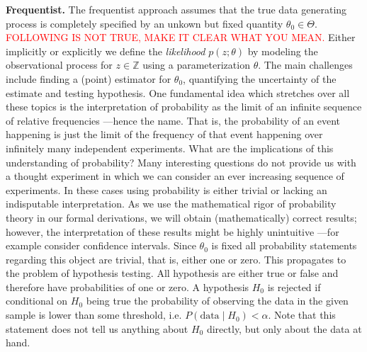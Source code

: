 \textbf{Frequentist.} The frequentist approach assumes that the true data generating process is completely specified by an unkown but fixed quantity $\theta_0 \in \Theta$.
\textcolor{red}{FOLLOWING IS NOT TRUE, MAKE IT CLEAR WHAT YOU MEAN.}
Either implicitly or explicitly we define the \textit{likelihood} $p(z; \theta)$ by modeling the observational process for $z \in \mathbb{Z}$ using a parameterization $\theta$.
The main challenges include finding a (point) estimator for $\theta_0$, quantifying the uncertainty of the estimate and testing hypothesis.
One fundamental idea which stretches over all these topics is the interpretation of probability as the limit of an infinite sequence of relative frequencies ---hence the name.
That is, the probability of an event happening is just the limit of the frequency of that event happening over infinitely many independent experiments.
What are the implications of this understanding of probability?
Many interesting questions do not provide us with a thought experiment in which we can consider an ever increasing sequence of experiments.
In these cases using probability is either trivial or lacking an indisputable interpretation.
As we use the mathematical rigor of probability theory in our formal derivations, we will obtain (mathematically) correct results; however, the interpretation of these results might be highly unintuitive ---for example consider confidence intervals.
Since $\theta_0$ is fixed all probability statements regarding this object are trivial, that is, either one or zero. This propagates to the problem of hypothesis testing.
All hypothesis are either true or false and therefore have probabilities of one or zero.
A hypothesis $H_0$ is rejected if conditional on $H_0$ being true the probability of observing the data in the given sample is lower than some threshold, i.e. $P(\text{data} \mid H_0) < \alpha$.
Note that this statement does not tell us anything about $H_0$ directly, but only about the data at hand.

